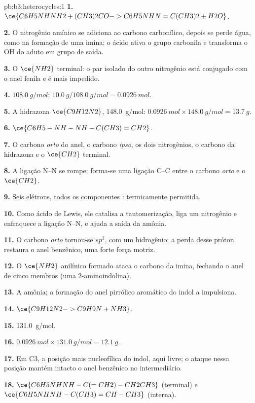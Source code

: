 \begin{solution}{pb:b3:heterocycles:1}
\textbf{1.} $\ce{C6H5NHNH2 + (CH3)2CO -> C6H5NHN=C(CH3)2 + H2O}$.

\textbf{2.} O nitrogênio amínico se adiciona ao carbono carbonílico, depois se perde água, como na
formação de uma imina; o ácido ativa o grupo carbonila e transforma o OH do aduto
em grupo de saída.

\textbf{3.} O $\ce{NH2}$ terminal: o par isolado do outro nitrogênio está conjugado com o
anel fenila e é mais impedido.

\textbf{4.} $\qty{108.0}{g/mol}$; $\qty{10.0}{g}/\qty{108.0}{g/mol} = \qty{0.0926}{mol}$.

\textbf{5.} A hidrazona $\ce{C9H12N2}$, \qty{148.0}{g/mol}: $\qty{0.0926}{mol} \times \qty{148.0}{g/mol} = \qty{13.7}{g}$.

\textbf{6.} $\ce{C6H5-NH-NH-C(CH3)=CH2}$.

\textbf{7.} O carbono \textit{orto} do anel, o carbono \textit{ipso}, os dois nitrogênios, o carbono da hidrazona
e o $\ce{CH2}$ terminal.

\textbf{8.} A ligação N--N se rompe; forma-se uma ligação C--C entre o carbono \textit{orto} e o $\ce{CH2}$.

\textbf{9.} Seis elétrons, todos os componentes : termicamente permitida.

\textbf{10.} Como ácido de Lewis, ele catalisa a tautomerização, liga um nitrogênio e
enfraquece a ligação N--N, e ajuda a saída da amônia.

\textbf{11.} O carbono \textit{orto} tornou-se $sp^3$, com um hidrogênio: a perda desse próton
restaura o anel benzênico, uma forte força motriz.

\textbf{12.} O $\ce{NH2}$ anilínico formado ataca o carbono da imina, fechando o
anel de cinco membros (uma 2-aminoindolina).

\textbf{13.} A amônia; a formação do anel pirrólico aromático do indol a impulsiona.

\textbf{14.} $\ce{C9H12N2 -> C9H9N + NH3}$.

\textbf{15.} \qty{131.0}{g/mol}.

\textbf{16.} $\qty{0.0926}{mol} \times \qty{131.0}{g/mol} = \qty{12.1}{g}$.

\textbf{17.} Em C3, a posição mais nucleofílica do indol, aqui livre; o ataque nessa posição
mantém intacto o anel benzênico no intermediário.

\textbf{18.} $\ce{C6H5NHNH-C(=CH2)-CH2CH3}$ (terminal) e $\ce{C6H5NHNH-C(CH3)=CH-CH3}$ (interna).


\end{solution}
